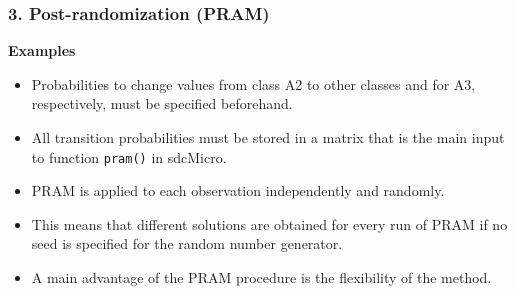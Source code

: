 \documentclass{beamer}
\begin{document}
\begin{frame}
	\frametitle{3. Post-randomization (PRAM)}
	\textbf{Examples}\\
	\begin{itemize}

\item Probabilities to change values from class A2 to other classes
and for A3, respectively, must be speciﬁed beforehand. 
\item All transition probabilities
must be stored in a matrix that is the main input to function \texttt{pram()} in sdcMicro.

\item PRAM is applied to each observation independently and randomly.
\item This means
that different solutions are obtained for every run of PRAM if no seed is specified
for the random number generator. 
\item A main advantage of the PRAM procedure is
the ﬂexibility of the method. 
\end{itemize}
\end{frame}
\end{document}

